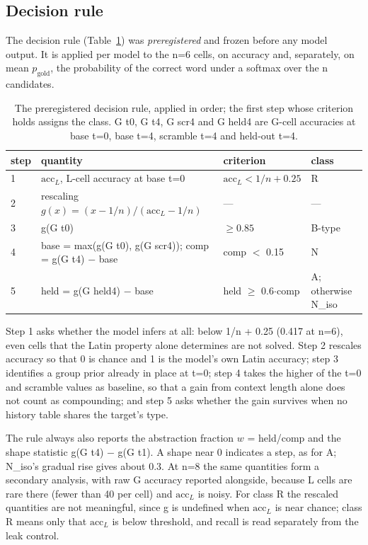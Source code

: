 \documentclass[11pt]{article}
\begin{document}
\subsection{Decision rule}\label{sec:rule}

The decision rule (Table~\ref{tab:rule}) was \emph{preregistered} and frozen before any model output. It is applied per model to the n=6 cells, on accuracy and, separately, on mean $p_{\mathrm{gold}}$, the probability of the correct word under a softmax over the n candidates.

\begin{table}[tbp]
\centering
\small
\caption{The preregistered decision rule, applied in order; the first step whose criterion holds assigns the class. G t0, G t4, G scr4 and G held4 are G-cell accuracies at base t=0, base t=4, scramble t=4 and held-out t=4.}\label{tab:rule}
\begin{tabularx}{\linewidth}{@{}l>{\raggedright\arraybackslash\hsize=1.9520\hsize}X>{\raggedright\arraybackslash\hsize=0.6774\hsize}X>{\raggedright\arraybackslash\hsize=0.3706\hsize}X@{}}
\toprule
step & quantity & criterion & class \\
\midrule
1 & $\mathrm{acc}_L$, L-cell accuracy at base t=0 & $\mathrm{acc}_L < 1/n + 0.25$ & R \\
2 & rescaling $g(x) = (x - 1/n)/(\mathrm{acc}_L - 1/n)$ & --- & --- \\
3 & g(G t0) & $\geq 0.85$ & B-type \\
4 & base = max(g(G t0), g(G scr4)); comp = g(G t4) $-$ base & comp $<$ 0.15 & N \\
5 & held = g(G held4) $-$ base & held $\geq$ 0.6$\cdot$comp & A; otherwise N\_iso \\
\bottomrule
\end{tabularx}
\end{table}

Step 1 asks whether the model infers at all: below 1/n + 0.25 (0.417 at n=6), even cells that the Latin property alone determines are not solved. Step 2 rescales accuracy so that 0 is chance and 1 is the model's own Latin accuracy; step 3 identifies a group prior already in place at t=0; step 4 takes the higher of the t=0 and scramble values as baseline, so that a gain from context length alone does not count as compounding; and step 5 asks whether the gain survives when no history table shares the target's type.

The rule always also reports the abstraction fraction $w$ = held/comp and the shape statistic g(G t4) $-$ g(G t1). A shape near 0 indicates a step, as for A; N\_iso's gradual rise gives about 0.3. At n=8 the same quantities form a secondary analysis, with raw G accuracy reported alongside, because L cells are rare there (fewer than 40 per cell) and $\mathrm{acc}_L$ is noisy. For class R the rescaled quantities are not meaningful, since g is undefined when $\mathrm{acc}_L$ is near chance; class R means only that $\mathrm{acc}_L$ is below threshold, and recall is read separately from the leak control.
\end{document}
